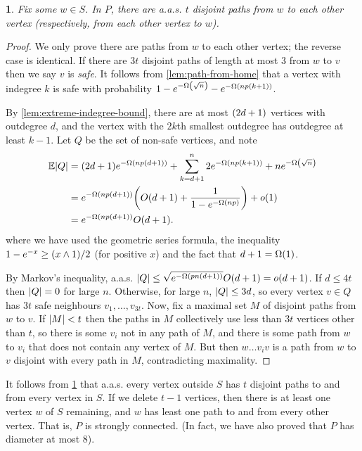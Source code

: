 \documentclass[11pt,english]{article}
\theoremstyle{plain}
\theoremstyle{definition}
\theoremstyle{definition}
\theoremstyle{plain}
\theoremstyle{plain}
\theoremstyle{plain}
\newtheorem{lem}[thm]{\protect\lemmaname}
\theoremstyle{plain}
\theoremstyle{remark}
\theoremstyle{remark}
\let\originalleft\left
\let\originalright\right
\renewcommand{\left}{\mathopen{}\mathclose\bgroup\originalleft}
\renewcommand{\right}{\aftergroup\egroup\originalright}
\providecommand{\lemmaname}{Lemma}
\begin{document}
\begin{lem}
\label{lem:lots-of-paths}Fix some $w\in S$. In $P$, there are a.a.s.
$t$ disjoint paths from $w$ to each other vertex (respectively,
from each other vertex to $w$).\end{lem}
\begin{proof}
We only prove there are paths from $w$ to each other vertex; the
reverse case is identical. If there are $3t$ disjoint paths of length
at most 3 from $w$ to $v$ then we say $v$ is \emph{safe}. It follows
from \ref{lem:path-from-home} that a vertex with indegree $k$ is
safe with probability $1-e^{-\Omega\left(\sqrt{n}\right)}-e^{-\Omega\left(np\left(k+1\right)\right)}$.

By \ref{lem:extreme-indegree-bound}, there are at most $\left(2d+1\right)$
vertices with outdegree $d$, and the vertex with the $2k$th smallest
outdegree has outdegree at least $k-1$. Let $Q$ be the set of non-safe
vertices, and note
\begin{align*}
\E\left|Q\right| & =\left(2d+1\right)e^{-\Omega\left(np\left(d+1\right)\right)}+\sum_{k=d+1}^{n}2e^{-\Omega\left(np\left(k+1\right)\right)}+ne^{-\Omega\left(\sqrt{n}\right)}\\
 & =e^{-\Omega\left(np\left(d+1\right)\right)}\left(O\left(d+1\right)+\frac{1}{1-e^{-\Omega\left(np\right)}}\right)+o\left(1\right)\\
 & =e^{-\Omega\left(np\left(d+1\right)\right)}O\left(d+1\right).
\end{align*}
where we have used the geometric series formula, the inequality $1-e^{-x}\ge\left(x\land1\right)/2$
(for positive $x$) and the fact that $d+1=\Omega\left(1\right)$.

By Markov's inequality, a.a.s. $\left|Q\right|\le\sqrt{e^{-\Omega\left(pn\left(d+1\right)\right)}}O\left(d+1\right)=o\left(d+1\right)$.
If $d\le4t$ then $\left|Q\right|=0$ for large $n$. Otherwise, for
large $n$, $\left|Q\right|\le3d$, so every vertex $v\in Q$ has
$3t$ safe neighbours $v_{1},\dots,v_{3t}$. Now, fix a maximal set
$M$ of disjoint paths from $w$ to $v$. If $\left|M\right|<t$ then
the paths in $M$ collectively use less than $3t$ vertices other
than $t$, so there is some $v_{i}$ not in any path of $M$, and
there is some path from $w$ to $v_{i}$ that does not contain any
vertex of $M$. But then $w\dots v_{i}v$ is a path from $w$ to $v$
disjoint with every path in $M$, contradicting maximality.
\end{proof}
It follows from \ref{lem:lots-of-paths} that a.a.s. every vertex
outside $S$ has $t$ disjoint paths to and from every vertex in $S$.
If we delete $t-1$ vertices, then there is at least one vertex $w$
of $S$ remaining, and $w$ has least one path to and from every other
vertex. That is, $P$ is strongly connected. (In fact, we have also
proved that $P$ has diameter at most 8).
\end{document}

